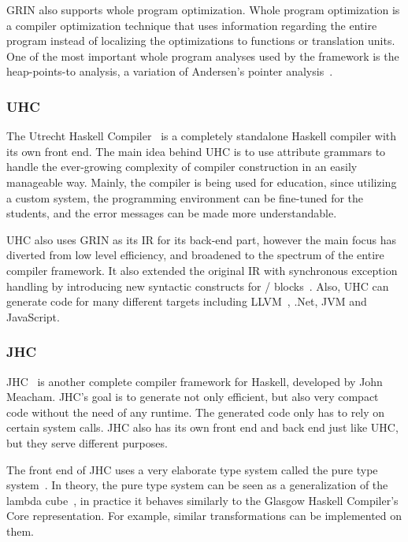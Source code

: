 \documentclass[main.tex]{subfiles}
\begin{document}
	GRIN also supports whole program optimization. Whole program optimization is a compiler optimization technique that uses information regarding the entire program instead of localizing the optimizations to functions or translation units. One of the most important whole program analyses used by the framework is the heap-points-to analysis, a variation of Andersen's pointer analysis~\cite{andersen-ptr}.
	
	\subsubsection{UHC}
	
	The Utrecht Haskell Compiler~\cite{uhc} is a completely standalone Haskell compiler with its own front end. The main idea behind UHC is to use attribute grammars to handle the ever-growing complexity of compiler construction in an easily manageable way. Mainly, the compiler is being used for education, since utilizing a custom system, the programming environment can be fine-tuned for the students, and the error messages can be made more understandable.
	
	UHC also uses GRIN as its IR for its back-end part, however the main focus has diverted from low level efficiency, and broadened to the spectrum of the entire compiler framework. It also extended the original IR with synchronous exception handling by introducing new syntactic constructs for / blocks~\cite{uhc-exceptional-grin}. Also, UHC can generate code for many different targets including LLVM~\cite{llvm-2004}, .Net, JVM and JavaScript.

	\subsubsection{JHC}
	
	JHC~\cite{jhc} is another complete compiler framework for Haskell, developed by John Meacham. JHC's goal is to generate not only efficient, but also very compact code without the need of any runtime. The generated code only has to rely on certain system calls. JHC also has its own front end and back end just like UHC, but they serve different purposes.
	
	The front end of JHC uses a very elaborate type system called the pure type system~\cite{pts-berardi, pts-terlouw}. In theory, the pure type system can be seen as a generalization of the lambda cube~\cite{lambda-cube}, in practice it behaves similarly to the Glasgow Haskell Compiler's Core representation. For example, similar transformations can be implemented on them.
	
\end{document}
